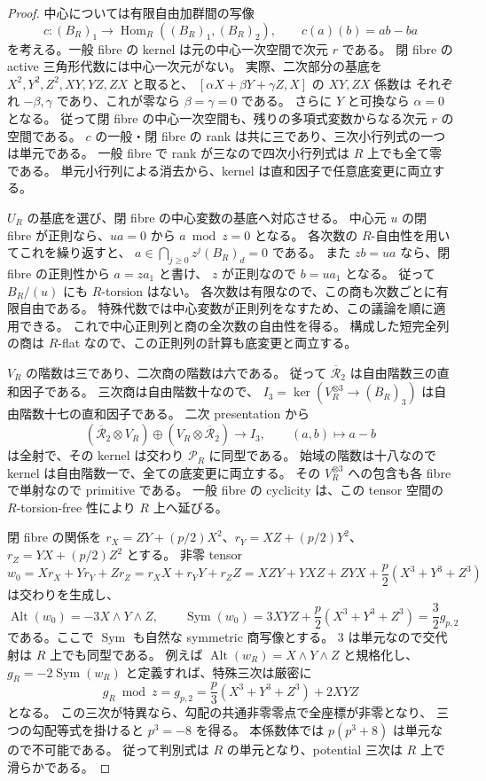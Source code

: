\begin{proof}
中心については有限自由加群間の写像
\[
 c:(B_R)_1\longrightarrow
     \operatorname{Hom}_R((B_R)_1,(B_R)_2),\qquad c(a)(b)=ab-ba
\]
を考える。一般 fibre の kernel は元の中心一次空間で次元 $r$ である。
閉 fibre の active 三角形代数には中心一次元がない。
実際、二次部分の基底を
$X^2,Y^2,Z^2,XY,YZ,ZX$ と取ると、
$[\alpha X+\beta Y+\gamma Z,X]$ の $XY,ZX$ 係数は
それぞれ $-\beta,\gamma$ であり、これが零なら $\beta=\gamma=0$ である。
さらに $Y$ と可換なら $\alpha=0$ となる。
従って閉 fibre の中心一次空間も、残りの多項式変数からなる次元 $r$ の空間である。
$c$ の一般・閉 fibre の rank は共に三であり、三次小行列式の一つは単元である。
一般 fibre で rank が三なので四次小行列式は $R$ 上でも全て零である。
単元小行列による消去から、kernel は直和因子で任意底変更に両立する。

$U_R$ の基底を選び、閉 fibre の中心変数の基底へ対応させる。
中心元 $u$ の閉 fibre が正則なら、$ua=0$ から $a\bmod z=0$ となる。
各次数の $R$-自由性を用いてこれを繰り返すと、
$a\in\bigcap_{j\ge0}z^j(B_R)_d=0$ である。
また $zb=ua$ なら、閉 fibre の正則性から $a=za_1$ と書け、
$z$ が正則なので $b=ua_1$ となる。
従って $B_R/(u)$ にも $R$-torsion はない。
各次数は有限なので、この商も次数ごとに有限自由である。
特殊代数では中心変数が正則列をなすため、この議論を順に適用できる。
これで中心正則列と商の全次数の自由性を得る。
構成した短完全列の商は $R$-flat なので、この正則列の計算も底変更と両立する。

$V_R$ の階数は三であり、二次商の階数は六である。
従って $\overline{\mathcal R}_2$ は自由階数三の直和因子である。
三次商は自由階数十なので、
$I_3=\ker(V_R^{\otimes3}\to(\overline B_R)_3)$ は自由階数十七の直和因子である。
二次 presentation から
\[
 (\overline{\mathcal R}_2\otimes V_R)\oplus
 (V_R\otimes\overline{\mathcal R}_2)\longrightarrow I_3,
 \qquad(a,b)\longmapsto a-b
\]
は全射で、その kernel は交わり $\mathcal P_R$ に同型である。
始域の階数は十八なので kernel は自由階数一で、全ての底変更に両立する。
その $V_R^{\otimes3}$ への包含も各 fibre で単射なので primitive である。
一般 fibre の cyclicity は、この tensor 空間の $R$-torsion-free 性により
$R$ 上へ延びる。

閉 fibre の関係を
$r_X=ZY+(p/2)X^2$、$r_Y=XZ+(p/2)Y^2$、
$r_Z=YX+(p/2)Z^2$ とする。
非零 tensor
\[
 w_0=Xr_X+Yr_Y+Zr_Z
     =r_XX+r_YY+r_ZZ
     =XZY+YXZ+ZYX+\frac p2(X^3+Y^3+Z^3)
\]
は交わりを生成し、
\[
 \operatorname{Alt}(w_0)=-3X\wedge Y\wedge Z,\qquad
 \operatorname{Sym}(w_0)
 =3XYZ+\frac p2(X^3+Y^3+Z^3)
 =\frac32 g_{p,2}
\]
である。ここで $\operatorname{Sym}$ も自然な symmetric 商写像とする。
$3$ は単元なので交代射は $R$ 上でも同型である。
例えば $\operatorname{Alt}(w_R)=X\wedge Y\wedge Z$ と規格化し、
$g_R=-2\operatorname{Sym}(w_R)$ と定義すれば、特殊三次は厳密に
\[
 g_R\bmod z=g_{p,2}=\frac p3(X^3+Y^3+Z^3)+2XYZ
\]
となる。
この三次が特異なら、勾配の共通非零零点で全座標が非零となり、
三つの勾配等式を掛けると $p^3=-8$ を得る。
本係数体では $p(p^3+8)$ は単元なので不可能である。
従って判別式は $R$ の単元となり、potential 三次は $R$ 上で滑らかである。
\end{proof}

